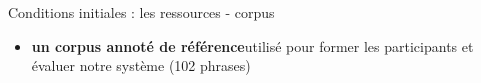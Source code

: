 \documentclass[french]{beamer}
\begin{document}
\begin{frame}{Conditions initiales : les ressources - corpus} 
  \begin{itemize}
  \item \small  \textbf{un corpus annoté de référence}\footnotemark[1] utilisé pour former les participants et évaluer notre système  (102 phrases) \\
    \vspace{-0.3cm}
    \begin{table}[]
      \centering
    \end{table}
    

\end{itemize}
\end{frame}
\end{document}
